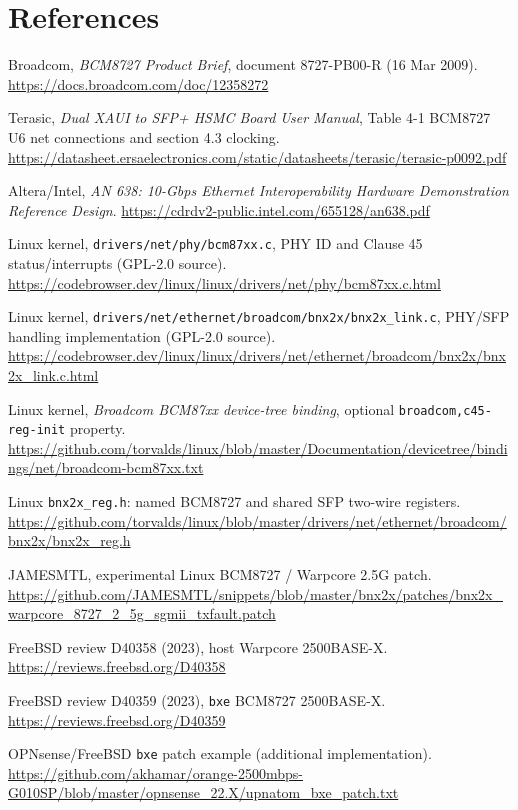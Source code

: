 \documentclass[10pt,a4paper]{article}
\begin{document}
\section{References}
\small\sloppy
\begin{description}[leftmargin=11mm,labelwidth=9mm,style=nextline]
\item[{[B]}] Broadcom, \emph{BCM8727 Product Brief}, document 8727-PB00-R (16 Mar 2009). \url{https://docs.broadcom.com/doc/12358272}
\item[{[T]}] Terasic, \emph{Dual XAUI to SFP+ HSMC Board User Manual}, Table 4-1 BCM8727 U6 net connections and section 4.3 clocking. \url{https://datasheet.ersaelectronics.com/static/datasheets/terasic/terasic-p0092.pdf}
\item[{[A]}] Altera/Intel, \emph{AN 638: 10-Gbps Ethernet Interoperability Hardware Demonstration Reference Design}. \url{https://cdrdv2-public.intel.com/655128/an638.pdf}
\item[{[L]}] Linux kernel, \texttt{drivers/net/phy/bcm87xx.c}, PHY ID and Clause 45 status/interrupts (GPL-2.0 source). \url{https://codebrowser.dev/linux/linux/drivers/net/phy/bcm87xx.c.html}
\item[{[N]}] Linux kernel, \texttt{drivers/net/ethernet/broadcom/bnx2x/bnx2x\_link.c}, PHY/SFP handling implementation (GPL-2.0 source). \url{https://codebrowser.dev/linux/linux/drivers/net/ethernet/broadcom/bnx2x/bnx2x_link.c.html}
\item[{[D]}] Linux kernel, \emph{Broadcom BCM87xx device-tree binding}, optional \texttt{broadcom,c45-reg-init} property. \url{https://github.com/torvalds/linux/blob/master/Documentation/devicetree/bindings/net/broadcom-bcm87xx.txt}
\item[{[H]}] Linux \texttt{bnx2x\_reg.h}: named BCM8727 and shared SFP two-wire registers. \url{https://github.com/torvalds/linux/blob/master/drivers/net/ethernet/broadcom/bnx2x/bnx2x_reg.h}
\item[{[X]}] JAMESMTL, experimental Linux BCM8727 / Warpcore 2.5G patch. \url{https://github.com/JAMESMTL/snippets/blob/master/bnx2x/patches/bnx2x_warpcore_8727_2_5g_sgmii_txfault.patch}
\item[{[F1]}] FreeBSD review D40358 (2023), host Warpcore 2500BASE-X. \url{https://reviews.freebsd.org/D40358}
\item[{[F2]}] FreeBSD review D40359 (2023), \texttt{bxe} BCM8727 2500BASE-X. \url{https://reviews.freebsd.org/D40359}
\item[{[P2]}] OPNsense/FreeBSD \texttt{bxe} patch example (additional implementation). \url{https://github.com/akhamar/orange-2500mbps-G010SP/blob/master/opnsense_22.X/upnatom_bxe_patch.txt}

\end{description}
\end{document}
